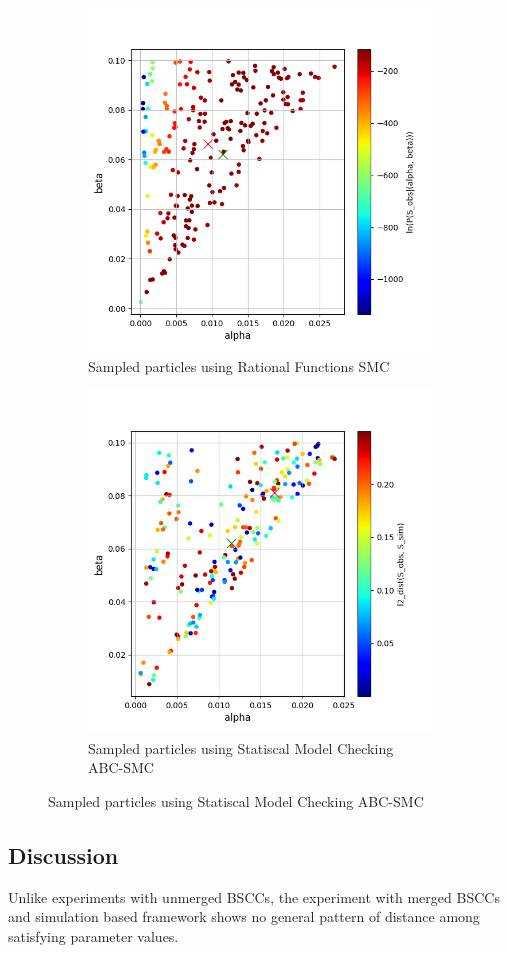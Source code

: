 \begin{figure}[H]
    \centering
    \begin{subfigure}{0.48\textwidth}
        \centering
        \includegraphics[width=\linewidth]{figures/sir1510_rfsmc_few.png}
        \caption{Sampled particles using Rational Functions SMC}
    \end{subfigure}
    \hfill
    \begin{subfigure}{0.48\textwidth}
        \centering
        \includegraphics[width=\linewidth]{figures/sir1510_abcsmc_few.png}
        \caption{Sampled particles using Statiscal Model Checking ABC-SMC}
    \end{subfigure}
\end{figure}

\subsection{Discussion}
Unlike experiments with unmerged BSCCs, the experiment with merged BSCCs and simulation based
framework shows no general pattern of distance among satisfying parameter values.

